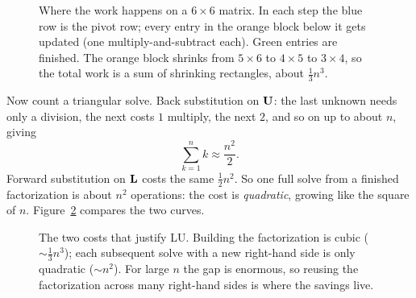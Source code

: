 \begin{figure}[htbp]
\centering
{}
\caption{Where the work happens on a $6\times 6$ matrix. In each step the blue row is the
pivot row; every entry in the orange block below it gets updated (one multiply-and-subtract
each). Green entries are finished. The orange block shrinks from $5\times 6$ to $4\times 5$ to
$3\times 4$, so the total work is a sum of shrinking rectangles, about $\tfrac13 n^3$.}
\label{ch09:fig-active-block}
\end{figure}

Now count a triangular solve. Back substitution on $\mathbf{U}$: the last unknown needs only a
division, the next costs $1$ multiply, the next $2$, and so on up to about $n$, giving
\[
  \sum_{k=1}^{n} k \approx \frac{n^2}{2}.
\]
Forward substitution on $\mathbf{L}$ costs the same $\tfrac12 n^2$. So one full solve from a
finished factorization is about $n^2$ operations: the cost is \emph{quadratic}, growing like
the square of $n$. Figure~\ref{ch09:fig-cost} compares the two curves.

\begin{figure}[H]
\centering
{}
\caption{The two costs that justify LU. Building the factorization is cubic ($\sim\tfrac13
n^3$); each subsequent solve with a new right-hand side is only quadratic ($\sim n^2$). For
large $n$ the gap is enormous, so reusing the factorization across many right-hand sides is
where the savings live.}
\label{ch09:fig-cost}
\end{figure}

